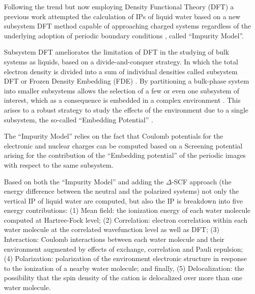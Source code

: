 \documentclass[notitlepage,12pt]{report}
\begin{document}
	Following the trend but now employing Density Functional Theory (DFT) \supercite{thomas1927calculation,fermi1927statistical, hogenberg, kohn} a previous work\supercite{tolle2019charged} attempted the calculation of IPs of liquid water based on a new subsystem DFT method\supercite{jacob2014subsystem,wesolowski2015frozen,krishtal2015subsystem} capable of approaching charged systems regardless of the underlying adoption of periodic boundary conditions \supercite{tolle2019charged}, called “Impurity Model”. 
	
	Subsystem DFT ameliorates the limitation of DFT in the studying of bulk systems as liquids, based on a divide-and-conquer strategy. In which the total electron density is divided into a sum of individual densities called subsystem DFT or Frozen Density Embedding (FDE) \supercite{mi2021eqe,mi2019nonlocal,mi2019ab}. By partitioning a bulk-phase system into smaller subsystems allows the selection of a few or even one subsystem of interest, which as a consequence is embedded in a complex environment \supercite{schmitt2020frozen}. This arises to a robust strategy to study the effects of the environment due to a single subsystem, the so-called “Embedding Potential” \supercite{genova2016avoiding}. 
	
	The “Impurity Model” relies on the fact that Coulomb potentials for the electronic and nuclear charges can be computed based on a Screening potential arising for the contribution of the “Embedding potential” of the periodic images with respect to the same subsystem\cite{tolle2019charged}.
	
	Based on both the “Impurity Model” and adding the $\Delta$-SCF approach\supercite{bagus1965self,waskom2017mwaskom} (the energy difference between the neutral and the polarized systems) not only the vertical IP of liquid water are computed, but also the IP is breakdown into five energy contributions:  (1) Mean field: the ionization energy of each water molecule computed at Hartree-Fock level; (2) Correlation: electron correlation within each water molecule at the correlated wavefunction level as well as DFT; (3) Interaction: Coulomb interactions between each water molecule and their environment augmented by effects of exchange, correlation and Pauli repulsion; (4) Polarization: polarization of the environment electronic structure in response to the ionization of a nearby water molecule; and finally, (5) Delocalization: the possibility that the spin density of the cation is delocalized over more than one water molecule.
	
\end{document}

